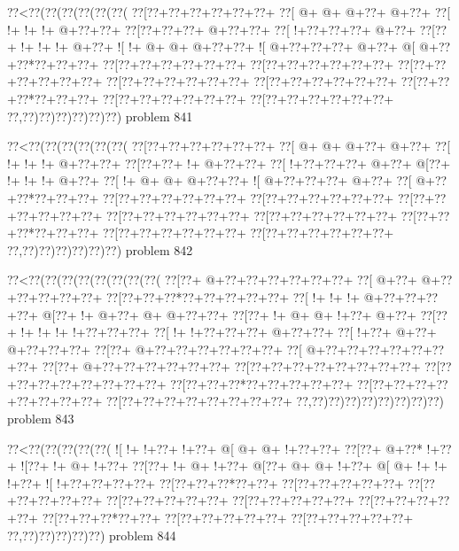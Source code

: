 \vbox{\vbox{\goo
\0??<\0??(\0??(\0??(\0??(\0??(\0??(
\0??[\0??+\0??+\0??+\0??+\0??+\0??+
\0??[\- @+\- @+\- @+\0??+\- @+\0??+
\0??[\- !+\- !+\- !+\- @+\0??+\0??+
\0??[\0??+\0??+\0??+\- @+\0??+\0??+
\0??[\- !+\0??+\0??+\0??+\- @+\0??+
\0??[\0??+\- !+\- !+\- !+\- @+\0??+
\- ![\- !+\- @+\- @+\- @+\0??+\0??+
\- ![\- @+\0??+\0??+\0??+\- @+\0??+
\- @[\- @+\0??+\0??*\0??+\0??+\0??+
\0??[\0??+\0??+\0??+\0??+\0??+\0??+
\0??[\0??+\0??+\0??+\0??+\0??+\0??+
\0??[\0??+\0??+\0??+\0??+\0??+\0??+
\0??[\0??+\0??+\0??+\0??+\0??+\0??+
\0??[\0??+\0??+\0??+\0??+\0??+\0??+
\0??[\0??+\0??+\0??*\0??+\0??+\0??+
\0??[\0??+\0??+\0??+\0??+\0??+\0??+
\0??[\0??+\0??+\0??+\0??+\0??+\0??+
\0??,\0??)\0??)\0??)\0??)\0??)\0??)
}
\hfil problem 841\hfil\break
}

\vbox{\vbox{\goo
\0??<\0??(\0??(\0??(\0??(\0??(\0??(
\0??[\0??+\0??+\0??+\0??+\0??+\0??+
\0??[\- @+\- @+\- @+\0??+\- @+\0??+
\0??[\- !+\- !+\- !+\- @+\0??+\0??+
\0??[\0??+\0??+\- !+\- @+\0??+\0??+
\0??[\- !+\0??+\0??+\0??+\- @+\0??+
\- @[\0??+\- !+\- !+\- !+\- @+\0??+
\0??[\- !+\- @+\- @+\- @+\0??+\0??+
\- ![\- @+\0??+\0??+\0??+\- @+\0??+
\0??[\- @+\0??+\0??*\0??+\0??+\0??+
\0??[\0??+\0??+\0??+\0??+\0??+\0??+
\0??[\0??+\0??+\0??+\0??+\0??+\0??+
\0??[\0??+\0??+\0??+\0??+\0??+\0??+
\0??[\0??+\0??+\0??+\0??+\0??+\0??+
\0??[\0??+\0??+\0??+\0??+\0??+\0??+
\0??[\0??+\0??+\0??*\0??+\0??+\0??+
\0??[\0??+\0??+\0??+\0??+\0??+\0??+
\0??[\0??+\0??+\0??+\0??+\0??+\0??+
\0??,\0??)\0??)\0??)\0??)\0??)\0??)
}
\hfil problem 842\hfil\break
}

\vbox{\vbox{\goo
\0??<\0??(\0??(\0??(\0??(\0??(\0??(\0??(\0??(
\0??[\0??+\- @+\0??+\0??+\0??+\0??+\0??+\0??+
\0??[\- @+\0??+\- @+\0??+\0??+\0??+\0??+\0??+
\0??[\0??+\0??+\0??*\0??+\0??+\0??+\0??+\0??+
\0??[\- !+\- !+\- !+\- @+\0??+\0??+\0??+\0??+
\- @[\0??+\- !+\- @+\0??+\- @+\- @+\0??+\0??+
\0??[\0??+\- !+\- @+\- @+\- !+\0??+\- @+\0??+
\0??[\0??+\- !+\- !+\- !+\- !+\0??+\0??+\0??+
\0??[\- !+\- !+\0??+\0??+\0??+\- @+\0??+\0??+
\0??[\- !+\0??+\- @+\0??+\- @+\0??+\0??+\0??+
\0??[\0??+\- @+\0??+\0??+\0??+\0??+\0??+\0??+
\0??[\- @+\0??+\0??+\0??+\0??+\0??+\0??+\0??+
\0??[\0??+\- @+\0??+\0??+\0??+\0??+\0??+\0??+
\0??[\0??+\0??+\0??+\0??+\0??+\0??+\0??+\0??+
\0??[\0??+\0??+\0??+\0??+\0??+\0??+\0??+\0??+
\0??[\0??+\0??+\0??*\0??+\0??+\0??+\0??+\0??+
\0??[\0??+\0??+\0??+\0??+\0??+\0??+\0??+\0??+
\0??[\0??+\0??+\0??+\0??+\0??+\0??+\0??+\0??+
\0??,\0??)\0??)\0??)\0??)\0??)\0??)\0??)\0??)
}
\hfil problem 843\hfil\break
}

\vbox{\vbox{\goo
\0??<\0??(\0??(\0??(\0??(\0??(
\- ![\- !+\- !+\0??+\- !+\0??+
\- @[\- @+\- @+\- !+\0??+\0??+
\0??[\0??+\- @+\0??*\- !+\0??+
\- ![\0??+\- !+\- @+\- !+\0??+
\0??[\0??+\- !+\- @+\- !+\0??+
\- @[\0??+\- @+\- @+\- !+\0??+
\- @[\- @+\- !+\- !+\- !+\0??+
\- ![\- !+\0??+\0??+\0??+\0??+
\0??[\0??+\0??+\0??*\0??+\0??+
\0??[\0??+\0??+\0??+\0??+\0??+
\0??[\0??+\0??+\0??+\0??+\0??+
\0??[\0??+\0??+\0??+\0??+\0??+
\0??[\0??+\0??+\0??+\0??+\0??+
\0??[\0??+\0??+\0??+\0??+\0??+
\0??[\0??+\0??+\0??*\0??+\0??+
\0??[\0??+\0??+\0??+\0??+\0??+
\0??[\0??+\0??+\0??+\0??+\0??+
\0??,\0??)\0??)\0??)\0??)\0??)
}
\hfil problem 844\hfil\break
}

